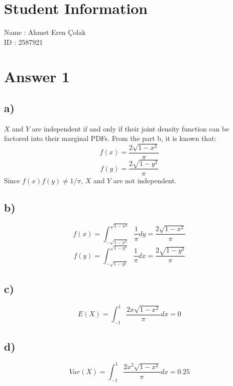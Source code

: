 \documentclass[12pt]{article}
\begin{document}
\section*{Student Information}

Name : Ahmet Eren Çolak\\

ID : 2587921\\


\section*{Answer 1}
\subsection*{a)}
$X$ and $Y$ are independent if and only if their joint density function can be factored into their marginal PDFs. From the part b, it is known that:
	\begin{equation*}
		f(x) = \frac{2 \sqrt{1-x^2}}{\pi}
	\end{equation*}
	\begin{equation*}
		f(y) = \frac{2 \sqrt{1-y^2}}{\pi}
	\end{equation*}
Since $f(x)f(y) \neq 1/\pi$, $X$ and $Y$ are not independent.
\subsection*{b)}
	\begin{equation*}
		f(x) = \int_{-\sqrt{1-x^2}}^{\sqrt{1-x^2}}\frac{1}{\pi}dy = \frac{2 \sqrt{1-x^2}}{\pi}
	\end{equation*}
	\begin{equation*}
		f(y) = \int_{-\sqrt{1-y^2}}^{\sqrt{1-y^2}}\frac{1}{\pi}dx = \frac{2 \sqrt{1-y^2}}{\pi}
	\end{equation*}
\subsection*{c)}
	\begin{equation*}
		E(X) = \int_{-1}^{1}\frac{2x \sqrt{1-x^2}}{\pi}dx = 0
	\end{equation*}
\subsection*{d)}
	\begin{equation*}
		Var(X) = \int_{-1}^{1}\frac{2x^2 \sqrt{1-x^2}}{\pi}dx = 0.25
	\end{equation*}
\end{document}
